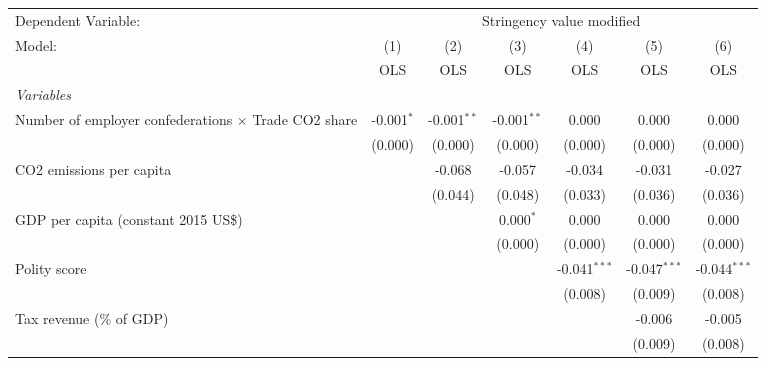
\begingroup
\centering
\begin{tabular}{lcccccc}
   \toprule
   Dependent Variable: & \multicolumn{6}{c}{Stringency value modified}\\
   Model:                                                      & (1)          & (2)           & (3)           & (4)            & (5)            & (6)\\  
                                                               &  OLS         & OLS           & OLS           & OLS            & OLS            & OLS\\  
   \midrule
   \emph{Variables}\\
   Number of employer confederations $\times$ Trade CO2 share  & -0.001$^{*}$ & -0.001$^{**}$ & -0.001$^{**}$ & 0.000          & 0.000          & 0.000\\   
                                                               & (0.000)      & (0.000)       & (0.000)       & (0.000)        & (0.000)        & (0.000)\\   
   CO2 emissions per capita                                    &              & -0.068        & -0.057        & -0.034         & -0.031         & -0.027\\   
                                                               &              & (0.044)       & (0.048)       & (0.033)        & (0.036)        & (0.036)\\   
   GDP per capita (constant 2015 US\$)                         &              &               & 0.000$^{*}$   & 0.000          & 0.000          & 0.000\\   
                                                               &              &               & (0.000)       & (0.000)        & (0.000)        & (0.000)\\   
   Polity score                                                &              &               &               & -0.041$^{***}$ & -0.047$^{***}$ & -0.044$^{***}$\\   
                                                               &              &               &               & (0.008)        & (0.009)        & (0.008)\\   
   Tax revenue (\% of GDP)                                     &              &               &               &                & -0.006         & -0.005\\   
                                                               &              &               &               &                & (0.009)        & (0.008)\\   

\end{tabular}

